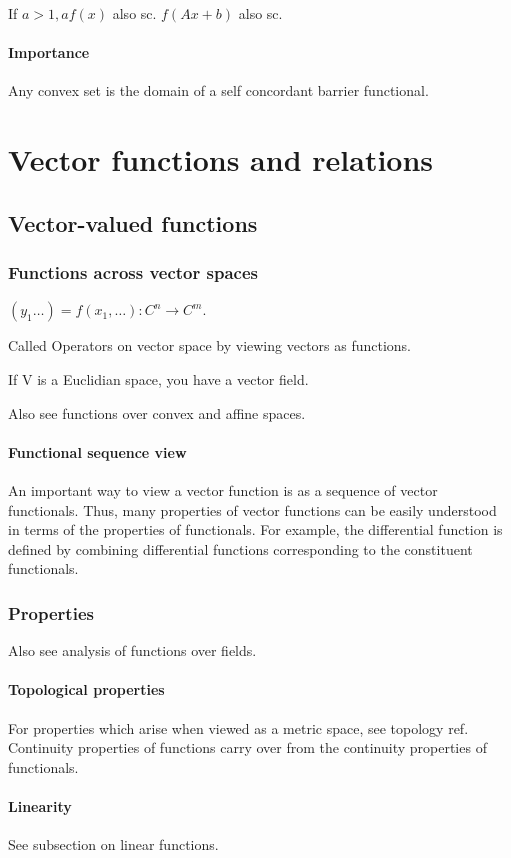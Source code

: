 \documentclass[oneside, article]{memoir}
\begin{document}
If $a>1, af(x)$ also sc. $f(Ax +b)$ also sc.

\subsection{Importance}
Any convex set is the domain of a self concordant barrier functional.

\part{Vector functions and relations}
\chapter{Vector-valued functions}
\section{Functions across vector spaces}
$(y_{1} \dots) = f(x_{1}, \dots): C^{n} \to C^{m}$.

Called Operators on vector space by viewing vectors as functions.

If V is a Euclidian space, you have a vector field.

Also see functions over convex and affine spaces.

\subsection{Functional sequence view}
An important way to view a vector function is as a sequence of vector functionals. Thus, many properties of vector functions can be easily understood in terms of the properties of functionals. For example, the differential function is defined by combining differential functions corresponding to the constituent functionals.

\section{Properties}
Also see analysis of functions over fields.

\subsection{Topological properties}
For properties which arise when viewed as a metric space, see topology ref. Continuity properties of functions carry over from the continuity properties of functionals.

\subsection{Linearity}
See subsection on linear functions.
\end{document}
